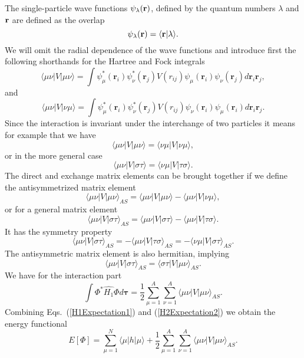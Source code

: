 The single-particle wave functions $\psi_{\lambda}({\bf r})$, defined
by the quantum numbers $\lambda$ and ${\bf r}$ are defined as the
overlap
\[
   \psi_{\lambda}({\bf r}) = \langle {\bf r} | \lambda \rangle .
\]
We will omit the radial dependence of the wave functions and introduce
first the following shorthands for the Hartree and Fock integrals
\[
\langle \mu\nu|V|\mu\nu\rangle = \int
\psi_{\mu}^*(\mathbf{r}_i)\psi_{\nu}^*(\mathbf{r}_j)V(r_{ij})\psi_{\mu}(\mathbf{r}_i)\psi_{\nu}(\mathbf{r}_j)
d\mathbf{r}_i\mathbf{r}_j,
\]
and
\[
\langle \mu\nu|V|\nu\mu\rangle = \int
\psi_{\mu}^*(\mathbf{r}_i)\psi_{\nu}^*(\mathbf{r}_j)
V(r_{ij})\psi_{\nu}(\mathbf{r}_i)\psi_{\mu}(\mathbf{r}_i)
d\mathbf{r}_i\mathbf{r}_j.
\]
Since the interaction is invariant under the interchange of two
particles it means for example that we have
\[
\langle \mu\nu|V|\mu\nu\rangle = \langle \nu\mu|V|\nu\mu\rangle,
\]
or in the more general case
\[
\langle \mu\nu|V|\sigma\tau\rangle = \langle
\nu\mu|V|\tau\sigma\rangle.
\]
The direct and exchange matrix elements can be brought together if we
define the antisymmetrized matrix element
\[
\langle \mu\nu|V|\mu\nu\rangle_{AS}= \langle
\mu\nu|V|\mu\nu\rangle-\langle \mu\nu|V|\nu\mu\rangle,
\]
or for a general matrix element
\[
\langle \mu\nu|V|\sigma\tau\rangle_{AS}= \langle
\mu\nu|V|\sigma\tau\rangle-\langle \mu\nu|V|\tau\sigma\rangle.
\]
It has the symmetry property
\[
\langle \mu\nu|V|\sigma\tau\rangle_{AS}= -\langle
\mu\nu|V|\tau\sigma\rangle_{AS}=-\langle
\nu\mu|V|\sigma\tau\rangle_{AS}.
\]
The antisymmetric matrix element is also hermitian, implying
\[
\langle \mu\nu|V|\sigma\tau\rangle_{AS}= \langle
\sigma\tau|V|\mu\nu\rangle_{AS}.
\]
We have for the interaction part
\begin{equation}
  \int \Phi^*\hat{H_1}\Phi d\mathbf{\tau} =
  \frac{1}{2}\sum_{\mu=1}^A\sum_{\nu=1}^A \langle
  \mu\nu|V|\mu\nu\rangle_{AS}.
\label{H2Expectation2}
\end{equation}
Combining Eqs.~(\ref{H1Expectation1}) and (\ref{H2Expectation2}) we
obtain the energy functional
\begin{equation}
  E[\Phi] = \sum_{\mu=1}^N \langle \mu | h | \mu \rangle +
  \frac{1}{2}\sum_{{\mu}=1}^A\sum_{{\nu}=1}^A \langle
  \mu\nu|V|\mu\nu\rangle_{AS}.
\label{FunctionalEPhi}
\end{equation}
 
